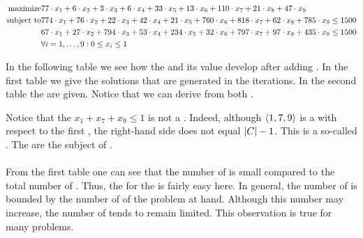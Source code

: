 \begin{example}
\begin{eqnarray}
\mbox{maximize}&77\cdot x_1+6\cdot x_2+3\cdot x_3+6\cdot x_4+33\cdot x_5+13\cdot x_6+110\cdot x_7+21\cdot x_8+47\cdot x_9\\
\mbox{subject to}&774\cdot x_1+76\cdot x_2+22\cdot x_3+42\cdot x_4+21\cdot x_5+760\cdot x_6+818\cdot x_7+62\cdot x_8+785\cdot x_9\leq 1500\\
&67\cdot x_1+27\cdot x_2+794\cdot x_3+53\cdot x_4+234\cdot x_5+32\cdot x_6+797\cdot x_7+97\cdot x_8+435\cdot x_9\leq 1500\\
&\forall\rangei[i]{1}{9}:0\leq x_i\leq 1
\end{eqnarray}

In the following table we see how the  and its value develop after adding . In the first table we give the solutions that are generated in the iterations. In the second table the  are given. Notice that we can derive  from both .



Notice that the  $x_1+x_7+x_9\leq1$ is not a . Indeed, although $\tupl{1,7,9}$ is a  with respect to the first , the right-hand side does not equal $\abs{C}-1$. This  is a so-called . The  are the subject of .

\paragraph{}
From the first table one can see that the number of  is small compared to the total number of . Thus, the  for the  is fairly easy here. In general, the number of  is bounded by the number of  of the problem at hand. Although this number may increase, the number of  tends to remain limited. This observation is true for many problems.
\end{example}


